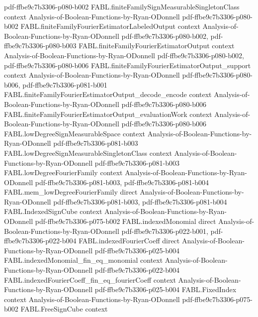 \begin{theorem}
  {pdf-ffbe9c7b3306-p080-b002}
\proofstep
  {FABL.finiteFamilySignMeasurableSingletonClass}
  {context}
  {Analysis-of-Boolean-Functions-by-Ryan-ODonnell}
  {pdf-ffbe9c7b3306-p080-b002}
\proofstep
  {FABL.finiteFamilyFourierEstimatorLabeledOutput}
  {context}
  {Analysis-of-Boolean-Functions-by-Ryan-ODonnell}
  {pdf-ffbe9c7b3306-p080-b002,
    pdf-ffbe9c7b3306-p080-b003}
\proofstep
  {FABL.finiteFamilyFourierEstimatorOutput}
  {context}
  {Analysis-of-Boolean-Functions-by-Ryan-ODonnell}
  {pdf-ffbe9c7b3306-p080-b002,
    pdf-ffbe9c7b3306-p080-b006}
\proofstep
  {FABL.finiteFamilyFourierEstimatorOutput_support}
  {context}
  {Analysis-of-Boolean-Functions-by-Ryan-ODonnell}
  {pdf-ffbe9c7b3306-p080-b006,
    pdf-ffbe9c7b3306-p081-b001}
\proofstep
  {FABL.finiteFamilyFourierEstimatorOutput_decode_encode}
  {context}
  {Analysis-of-Boolean-Functions-by-Ryan-ODonnell}
  {pdf-ffbe9c7b3306-p080-b006}
\proofstep
  {FABL.finiteFamilyFourierEstimatorOutput_evaluationWork}
  {context}
  {Analysis-of-Boolean-Functions-by-Ryan-ODonnell}
  {pdf-ffbe9c7b3306-p080-b006}
\proofstep
  {FABL.lowDegreeSignMeasurableSpace}
  {context}
  {Analysis-of-Boolean-Functions-by-Ryan-ODonnell}
  {pdf-ffbe9c7b3306-p081-b003}
\proofstep
  {FABL.lowDegreeSignMeasurableSingletonClass}
  {context}
  {Analysis-of-Boolean-Functions-by-Ryan-ODonnell}
  {pdf-ffbe9c7b3306-p081-b003}
\proofstep
  {FABL.lowDegreeFourierFamily}
  {context}
  {Analysis-of-Boolean-Functions-by-Ryan-ODonnell}
  {pdf-ffbe9c7b3306-p081-b003,
    pdf-ffbe9c7b3306-p081-b004}
\proofstep
  {FABL.mem_lowDegreeFourierFamily}
  {direct}
  {Analysis-of-Boolean-Functions-by-Ryan-ODonnell}
  {pdf-ffbe9c7b3306-p081-b003,
    pdf-ffbe9c7b3306-p081-b004}
\proofstep
  {FABL.IndexedSignCube}
  {context}
  {Analysis-of-Boolean-Functions-by-Ryan-ODonnell}
  {pdf-ffbe9c7b3306-p075-b002}
\proofstep
  {FABL.indexedMonomial}
  {direct}
  {Analysis-of-Boolean-Functions-by-Ryan-ODonnell}
  {pdf-ffbe9c7b3306-p022-b001,
    pdf-ffbe9c7b3306-p022-b004}
\proofstep
  {FABL.indexedFourierCoeff}
  {direct}
  {Analysis-of-Boolean-Functions-by-Ryan-ODonnell}
  {pdf-ffbe9c7b3306-p025-b004}
\proofstep
  {FABL.indexedMonomial_fin_eq_monomial}
  {context}
  {Analysis-of-Boolean-Functions-by-Ryan-ODonnell}
  {pdf-ffbe9c7b3306-p022-b004}
\proofstep
  {FABL.indexedFourierCoeff_fin_eq_fourierCoeff}
  {context}
  {Analysis-of-Boolean-Functions-by-Ryan-ODonnell}
  {pdf-ffbe9c7b3306-p025-b004}
\proofstep
  {FABL.FixedIndex}
  {context}
  {Analysis-of-Boolean-Functions-by-Ryan-ODonnell}
  {pdf-ffbe9c7b3306-p075-b002}
\proofstep
  {FABL.FreeSignCube}
  {context}

\end{theorem}
